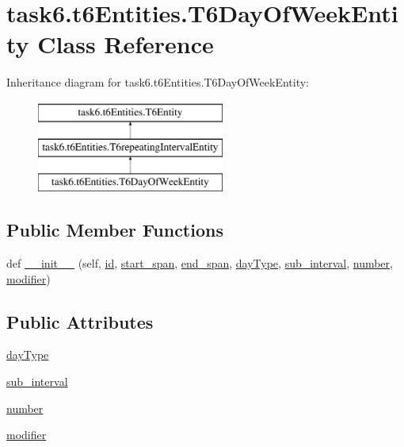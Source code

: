 \hypertarget{classtask6_1_1t6Entities_1_1T6DayOfWeekEntity}{}\section{task6.\+t6\+Entities.\+T6\+Day\+Of\+Week\+Entity Class Reference}
\label{classtask6_1_1t6Entities_1_1T6DayOfWeekEntity}
Inheritance diagram for task6.\+t6\+Entities.\+T6\+Day\+Of\+Week\+Entity\+:\begin{figure}[H]
\begin{center}
\leavevmode
\includegraphics[height=3.000000cm]{classtask6_1_1t6Entities_1_1T6DayOfWeekEntity}
\end{center}
\end{figure}
\subsection*{Public Member Functions}
\begin{DoxyCompactItemize}
\item 
def \hyperlink{classtask6_1_1t6Entities_1_1T6DayOfWeekEntity_a2fc54558a59058cb9da92c440a33f7df}{\+\_\+\+\_\+init\+\_\+\+\_\+} (self, \hyperlink{classtask6_1_1t6Entities_1_1T6Entity_afeeced8134bb3ebe0cfecc64d0ab46a4}{id}, \hyperlink{classtask6_1_1t6Entities_1_1T6Entity_a52779e9af8864dc98e8b02fc5b9b041a}{start\+\_\+span}, \hyperlink{classtask6_1_1t6Entities_1_1T6Entity_aeb402200b156cd9562c5111dfe777b98}{end\+\_\+span}, \hyperlink{classtask6_1_1t6Entities_1_1T6DayOfWeekEntity_a0b096374634bcd3824100aa0b8b03416}{day\+Type}, \hyperlink{classtask6_1_1t6Entities_1_1T6DayOfWeekEntity_a8360936a4d61df06f3e84b74cc96812e}{sub\+\_\+interval}, \hyperlink{classtask6_1_1t6Entities_1_1T6DayOfWeekEntity_a6c4716d536e9be2dba85c5702618b53f}{number}, \hyperlink{classtask6_1_1t6Entities_1_1T6DayOfWeekEntity_a1d18a5075422ee92873d2e995e78a3f7}{modifier})
\end{DoxyCompactItemize}
\subsection*{Public Attributes}
\begin{DoxyCompactItemize}
\item 
\hyperlink{classtask6_1_1t6Entities_1_1T6DayOfWeekEntity_a0b096374634bcd3824100aa0b8b03416}{day\+Type}
\item 
\hyperlink{classtask6_1_1t6Entities_1_1T6DayOfWeekEntity_a8360936a4d61df06f3e84b74cc96812e}{sub\+\_\+interval}
\item 
\hyperlink{classtask6_1_1t6Entities_1_1T6DayOfWeekEntity_a6c4716d536e9be2dba85c5702618b53f}{number}
\item 
\hyperlink{classtask6_1_1t6Entities_1_1T6DayOfWeekEntity_a1d18a5075422ee92873d2e995e78a3f7}{modifier}
\end{DoxyCompactItemize}


